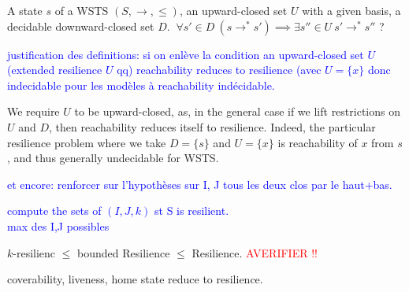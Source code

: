{A state $s$ of a WSTS $(S,\rightarrow, \leq)$, an upward-closed set $U$ with a given basis, a decidable downward-closed set $D$.}
{$ ~ \forall s' \in D ~ (s \rightarrow^* s') \implies \exists s'' \in U ~ s' \rightarrow^{*} s''$ ?\newline}

\textcolor{blue}{
justification des definitions: si on enlève la condition  an upward-closed set $U$ (extended resilience $U$ qq) reachability reduces to resilience (avec $U=\{x\}$ donc indecidable pour les modèles à reachability indécidable.
}

\begin{remark} 
We require $U$ to be upward-closed, as, in the general case if we lift restrictions on $U$ and $D$, then reachability reduces itself to resilience. Indeed, the particular resilience problem where we take $D = \{s\}$ and $U = \{x\}$ is reachability of $x$ from $s$, and thus generally undecidable for WSTS. 
\end{remark}

\textcolor{blue}{
et encore: renforcer sur l'hypothèses sur I, J tous les deux clos par le haut+bas.
}

\textcolor{blue}{
compute the sets of $(I,J,k)$ st S is resilient.\\
max des I,J possibles \\
}

\begin{remark} 
$k$-resilienc $\leq$ bounded Resilience $\leq$ Resilience.  \textcolor{red}{AVERIFIER !!}
\end{remark}


\begin{proposition}\label{reductions}
coverability, liveness, home state 
 reduce to resilience.
\end{proposition}



